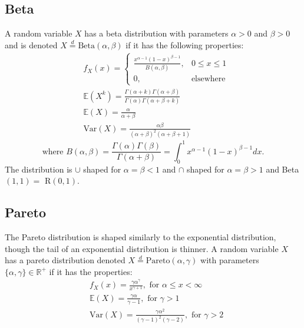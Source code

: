 \documentclass[titlepage,twocolumn]{article}
\begin{document}
\subsection*{Beta}
A random variable $X$ has a beta distribution with parameters $\alpha >0$ and $\beta > 0$ and is denoted $X\stackrel{d}{=}\mbox{Beta}(\alpha, \beta)$ if it has the following properties:
\begin{align*}
    &f_X(x)=\begin{cases} \frac{x^{\alpha-1}(1-x)^{\beta-1}}{B(\alpha,\beta)}, & 0 \leq x \leq 1 \\ 0, & \mbox{elsewhere} \end{cases}\\
    &\mathbb{E}(X^k)=\frac{\Gamma(\alpha+k)\Gamma(\alpha+\beta)}{\Gamma(\alpha)\Gamma(\alpha+\beta+k)}\\
    &\mathbb{E}(X)=\frac{\alpha}{\alpha+\beta}\\
    &\mbox{Var}(X)=\frac{\alpha \beta}{(\alpha+\beta)^2(\alpha+\beta+1)}
\end{align*}
$$\mbox{where }B(\alpha,\beta) = \frac{\Gamma(\alpha)\Gamma(\beta)}{\Gamma(\alpha+\beta)} = \int_0^1x^{\alpha-1}(1-x)^{\beta-1}dx.$$
The distribution is $\cup$ shaped for $\alpha = \beta < 1$ and $\cap$ shaped for $\alpha = \beta > 1$ and Beta$(1,1) =$ R$(0,1)$.

\subsection*{Pareto}
The Pareto distribution is shaped similarly to the exponential distribution, though the tail of an exponential distribution is thinner. A random variable $X$ has a pareto distribution denoted $X\stackrel{d}{=}\mbox{Pareto}(\alpha, \gamma)$ with parameters $\{\alpha,\gamma \} \in \mathbb{R}^+$ if it has the properties:
\begin{align*}
    &f_X(x)=\frac{\gamma \alpha^\gamma}{x^{\gamma+1}}, \mbox{ for } \alpha \leq x < \infty\\
    &\mathbb{E}(X)=\frac{\gamma \alpha}{\gamma - 1}, \mbox{ for } \gamma > 1\\
    &\mbox{Var}(X)=\frac{\gamma \alpha^2}{(\gamma-1)^2(\gamma - 2)}, \mbox{ for } \gamma > 2
\end{align*}
\vfill
\end{document}

